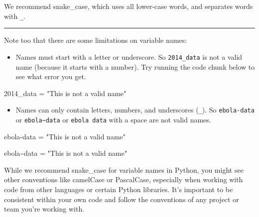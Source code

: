 \documentclass[
  letterpaper,
  DIV=11,
  numbers=noendperiod]{scrreprt}
\newenvironment{Shaded}{\begin{snugshade}}{\end{snugshade}}
\newcommand{\DecValTok}[1]{\textcolor[rgb]{0.68,0.00,0.00}{#1}}
\newcommand{\ErrorTok}[1]{\textcolor[rgb]{0.68,0.00,0.00}{#1}}
\newcommand{\NormalTok}[1]{\textcolor[rgb]{0.00,0.23,0.31}{#1}}
\newcommand{\OperatorTok}[1]{\textcolor[rgb]{0.37,0.37,0.37}{#1}}
\newcommand{\StringTok}[1]{\textcolor[rgb]{0.13,0.47,0.30}{#1}}
\providecommand{\tightlist}{%
  \setlength{\itemsep}{0pt}\setlength{\parskip}{0pt}}\usepackage{longtable,booktabs,array}
\begin{document}
We recommend snake\_case, which uses all lower-case words, and separates
words with \texttt{\_}.

\begin{center}\rule{0.5\linewidth}{0.5pt}\end{center}

Note too that there are some limitations on variable names:

\begin{itemize}
\tightlist
\item
  Names must start with a letter or underscore. So \texttt{2014\_data}
  is not a valid name (because it starts with a number). Try running the
  code chunk below to see what error you get.
\end{itemize}

\begin{Shaded}
\begin{Highlighting}[]
\DecValTok{2014}\ErrorTok{\_data} \OperatorTok{=} \StringTok{"This is not a valid name"}
\end{Highlighting}
\end{Shaded}

\begin{itemize}
\tightlist
\item
  Names can only contain letters, numbers, and underscores
  (\texttt{\_}). So \texttt{ebola-data} or
  \texttt{ebola\textasciitilde{}data} or \texttt{ebola\ data} with a
  space are not valid names.
\end{itemize}

\begin{Shaded}
\begin{Highlighting}[]
\NormalTok{ebola}\OperatorTok{{-}}\NormalTok{data }\OperatorTok{=} \StringTok{"This is not a valid name"}
\end{Highlighting}
\end{Shaded}

\begin{Shaded}
\begin{Highlighting}[]
\NormalTok{ebola}\OperatorTok{\textasciitilde{}}\NormalTok{data }\OperatorTok{=} \StringTok{"This is not a valid name"}
\end{Highlighting}
\end{Shaded}

\begin{tcolorbox}[enhanced jigsaw, colframe=quarto-callout-note-color-frame, opacityback=0, titlerule=0mm, bottomrule=.15mm, breakable, leftrule=.75mm, colbacktitle=quarto-callout-note-color!10!white, title=\textcolor{quarto-callout-note-color}{\faInfo}\hspace{0.5em}{Side note}, rightrule=.15mm, coltitle=black, opacitybacktitle=0.6, colback=white, left=2mm, arc=.35mm, toptitle=1mm, bottomtitle=1mm, toprule=.15mm]

While we recommend snake\_case for variable names in Python, you might
see other conventions like camelCase or PascalCase, especially when
working with code from other languages or certain Python libraries. It's
important to be consistent within your own code and follow the
conventions of any project or team you're working with.

\end{tcolorbox}
\end{document}
